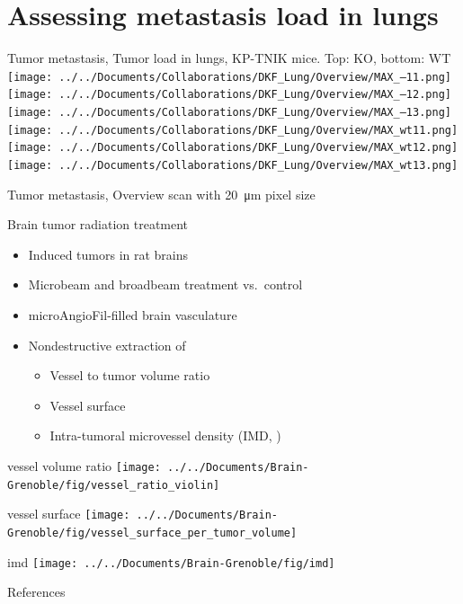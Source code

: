 \documentclass[draft,caption=numbered]{beamer}
\newcommand{\imsize}{\linewidth}
\newcommand{\uaf}{\si{micro}AngioFil}
\begin{document}
\section{Assessing metastasis load in lungs}
\renewcommand{\imsize}{0.3\linewidth}  
\begin{frame}{Tumor metastasis, Tumor load in lungs, KP-TNIK mice. Top: KO, bottom: WT}
    \centering
    \texttt{[image: ../../Documents/Collaborations/DKF\_Lung/Overview/MAX\_--11.png]}%
    \texttt{[image: ../../Documents/Collaborations/DKF\_Lung/Overview/MAX\_--12.png]}%
    \texttt{[image: ../../Documents/Collaborations/DKF\_Lung/Overview/MAX\_--13.png]}\\%
    \texttt{[image: ../../Documents/Collaborations/DKF\_Lung/Overview/MAX\_wt11.png]}%
    \texttt{[image: ../../Documents/Collaborations/DKF\_Lung/Overview/MAX\_wt12.png]}%
    \texttt{[image: ../../Documents/Collaborations/DKF\_Lung/Overview/MAX\_wt13.png]}%
\end{frame}

\begin{frame}{Tumor metastasis, Overview scan with \SI{20}{\micro\meter} pixel size}
    \centering
\end{frame}

\begin{frame}{Brain tumor radiation treatment}
    \begin{itemize}
        \item Induced tumors in rat brains
        \item Microbeam and broadbeam treatment vs.\ control
        \item \uaf-filled brain vasculature
        \item Nondestructive extraction of
        \begin{itemize}
            \item Vessel to tumor volume ratio
            \item Vessel surface
            \item Intra-tumoral microvessel density (IMD, \cite{Hasan2002})
        \end{itemize}
    \end{itemize}
\end{frame}

\begin{frame}{vessel volume ratio}
    \centering
    \texttt{[image: ../../Documents/Brain-Grenoble/fig/vessel\_ratio\_violin]}
\end{frame}


\begin{frame}{vessel surface}
    \centering
    \texttt{[image: ../../Documents/Brain-Grenoble/fig/vessel\_surface\_per\_tumor\_volume]}
\end{frame}

\begin{frame}{imd}
    \centering
    \texttt{[image: ../../Documents/Brain-Grenoble/fig/imd]}
\end{frame}


\begin{frame}{References}
    \renewcommand*{\bibfont}{\tiny}
    \printbibliography
\end{frame}
\end{document}
